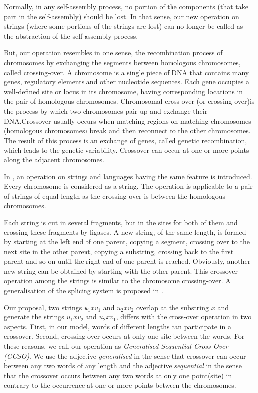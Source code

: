 \documentclass{llncs}
\begin{document}
Normally, in any self-assembly process, no portion of the components
(that take part in the self-assembly) should be lost.  In that
sense, our new operation on strings (where some portions of the
strings are lost) can no longer be called as the abstraction of the
self-assembly process.
\par
But, our operation resembles in one sense, the recombination process
of chromosomes by exchanging the segments between homologous
chromosomes, called crossing-over. A chromosome is a single piece of
DNA that contains many genes, regulatory elements and other
nucleotide sequences.  Each gene occupies a well-defined site or
locus in its chromosome, having corresponding locations in the pair
of homologous chromosomes.  Chromosomal cross over (or crossing
over)is the process by which two chromosomes pair up and exchange
their DNA.Crossover usually occurs when matching regions on matching
chromosomes (homologous chromosomes) break and then reconnect to the
other chromosomes.  The result of this process is an exchange of
genes, called genetic recombination, which leads to the genetic
variability.  Crossover can occur at one or more points along the
adjacent chromosomes.
\par
In \cite{mitrana1}, an operation on strings and languages having the
same feature is introduced.  Every chromosome is considered as a
string.  The operation is applicable to a pair of strings of equal
length as the crossing over is between the homologous chromosomes.
\par
Each string is cut in several fragments, but in the sites for both
of them and crossing these fragments by ligases.  A new string, of
the same length, is formed by starting at the left end of one
parent, copying a segment, crossing over to the next site in the
other parent, copying a substring, crossing back to the first parent
and so on until the right end of one parent is reached.  Obviously,
another new string can be obtained by starting with the other
parent.  This crossover operation \cite{mitrana1} among the strings
is similar to the chromosome crossing-over.  A generalisation of the
splicing system is proposed in \cite{mitrana2}.
\par
Our proposal, two strings $u_1xv_1$
  and $u_2xv_2$ overlap at  the substring $x$
    and generate the strings $u_1xv_2$ and $u_2xv_1$, differs with
    the cross-over operation in two aspects. First, in our model,
    words of different lengths can participate in a crossover.
    Second, crossing over occurs at only one site between the words.
     For these reasons, we call our operation as
     {\em Generalised Sequential Cross Over (GCSO)}.  We use the
     adjective {\it generalised} in the sense that crossover can
     occur between any two words of any length and the adjective
     {\it sequential} in the sense that the crossover occurs between
     any two words at only one point(site) in contrary to the
     occurrence at one or more points between the chromosomes.
\end{document}
